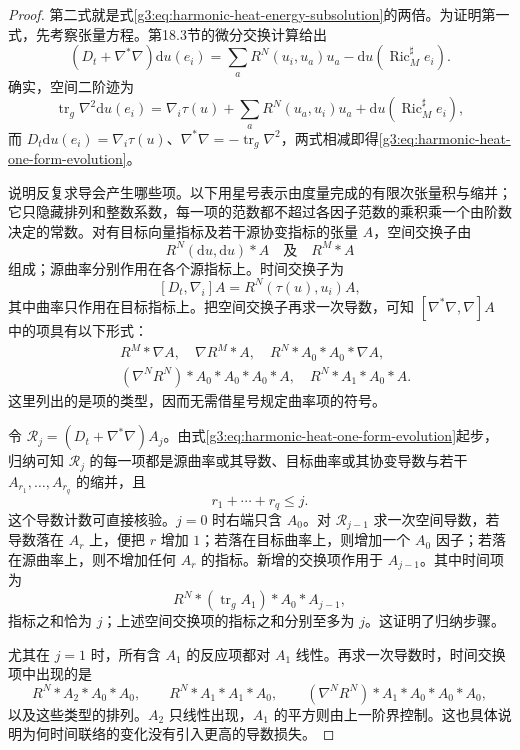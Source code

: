 \begin{proof}
	第二式就是式\eqref{g3:eq:harmonic-heat-energy-subsolution}的两倍。为证明第一式，先考察张量方程。第18.3节的微分交换计算给出
	\begin{equation}\label{g3:eq:harmonic-heat-one-form-evolution}
		(D_t+\nabla^*\nabla)\mathrm du(e_i)
		=\sum_aR^N(u_i,u_a)u_a
		-\mathrm du(\operatorname{Ric}_M^\sharp e_i).
	\end{equation}
	确实，空间二阶迹为
	\[
		\operatorname{tr}_g\nabla^2\mathrm du(e_i)
		=\nabla_i\tau(u)+\sum_aR^N(u_a,u_i)u_a
		+\mathrm du(\operatorname{Ric}_M^\sharp e_i),
	\]
	而 \(D_t\mathrm du(e_i)=\nabla_i\tau(u)\)、\(\nabla^*\nabla=-\operatorname{tr}_g\nabla^2\)，两式相减即得\eqref{g3:eq:harmonic-heat-one-form-evolution}。

	说明反复求导会产生哪些项。以下用星号表示由度量完成的有限次张量积与缩并；它只隐藏排列和整数系数，每一项的范数都不超过各因子范数的乘积乘一个由阶数决定的常数。对有目标向量指标及若干源协变指标的张量 \(A\)，空间交换子由
	\[
		R^N(\mathrm du,\mathrm du)*A\quad\text{及}\quad R^M*A
	\]
	组成；源曲率分别作用在各个源指标上。时间交换子为
	\[
		[D_t,\nabla_i]A=R^N(\tau(u),u_i)A,
	\]
	其中曲率只作用在目标指标上。把空间交换子再求一次导数，可知 \([\nabla^*\nabla,\nabla]A\) 中的项具有以下形式：
	\begin{align*}
		&R^M*\nabla A,\quad \nabla R^M*A,
		\quad R^N*A_0*A_0*\nabla A,\\
		&(\nabla^NR^N)*A_0*A_0*A_0*A,
		\quad R^N*A_1*A_0*A.
	\end{align*}
	这里列出的是项的类型，因而无需借星号规定曲率项的符号。

	令 \(\mathcal R_j=(D_t+\nabla^*\nabla)A_j\)。由式\eqref{g3:eq:harmonic-heat-one-form-evolution}起步，归纳可知 \(\mathcal R_j\) 的每一项都是源曲率或其导数、目标曲率或其协变导数与若干 \(A_{r_1},\ldots,A_{r_q}\) 的缩并，且
	\begin{equation}\label{g3:eq:harmonic-heat-derivative-count}
		r_1+\cdots+r_q\le j.
	\end{equation}
	这个导数计数可直接核验。\(j=0\) 时右端只含 \(A_0\)。对 \(\mathcal R_{j-1}\) 求一次空间导数，若导数落在 \(A_r\) 上，便把 \(r\) 增加 \(1\)；若落在目标曲率上，则增加一个 \(A_0\) 因子；若落在源曲率上，则不增加任何 \(A_r\) 的指标。新增的交换项作用于 \(A_{j-1}\)。其中时间项为
	\[
		R^N*(\operatorname{tr}_gA_1)*A_0*A_{j-1},
	\]
	指标之和恰为 \(j\)；上述空间交换项的指标之和分别至多为 \(j\)。这证明了归纳步骤。

	尤其在 \(j=1\) 时，所有含 \(A_1\) 的反应项都对 \(A_1\) 线性。再求一次导数时，时间交换项中出现的是
	\[
		R^N*A_2*A_0*A_0,\qquad
		R^N*A_1*A_1*A_0,\qquad
		(\nabla^NR^N)*A_1*A_0*A_0*A_0,
	\]
	以及这些类型的排列。\(A_2\) 只线性出现，\(A_1\) 的平方则由上一阶界控制。这也具体说明为何时间联络的变化没有引入更高的导数损失。


\end{proof}
